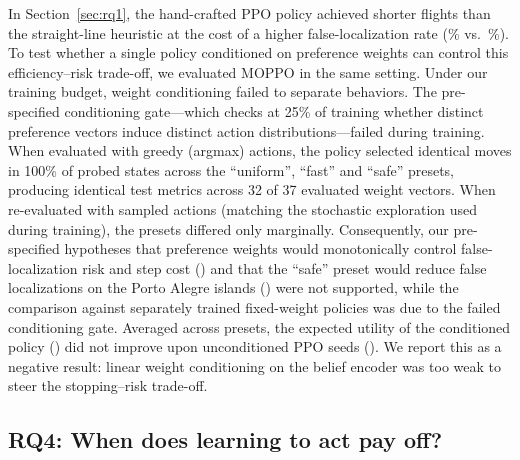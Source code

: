 In Section~\ref{sec:rq1}, the hand-crafted PPO policy achieved shorter flights than the straight-line heuristic at the cost of a higher false-localization rate (\vOneFalseLocPpoSTwo\% vs.\ \vOneFalseLocStraightSTwo\%). To test whether a single policy conditioned on preference weights can control this efficiency--risk trade-off, we evaluated MOPPO in the same setting. Under our training budget, weight conditioning failed to separate behaviors. The pre-specified conditioning gate—which checks at 25\% of training whether distinct preference vectors induce distinct action distributions—failed during training. When evaluated with greedy (argmax) actions, the policy selected identical moves in 100\% of probed states across the ``uniform'', ``fast'' and ``safe'' presets, producing identical test metrics across 32 of 37 evaluated weight vectors. When re-evaluated with sampled actions (matching the stochastic exploration used during training), the presets differed only marginally. Consequently, our pre-specified hypotheses that preference weights would monotonically control false-localization risk and step cost (\moHSixVerdict) and that the ``safe'' preset would reduce false localizations on the Porto Alegre islands (\moHSevenVerdict) were not supported, while the comparison against separately trained fixed-weight policies was \moHFourVerdict{} due to the failed conditioning gate. Averaged across presets, the expected utility of the conditioned policy (\moEumSampled) did not improve upon unconditioned PPO seeds (\moEumPocSampled). We report this as a negative result: linear weight conditioning on the belief encoder was too weak to steer the stopping--risk trade-off.

\subsection{RQ4: When does learning to act pay off?}
\label{sec:rq4}

